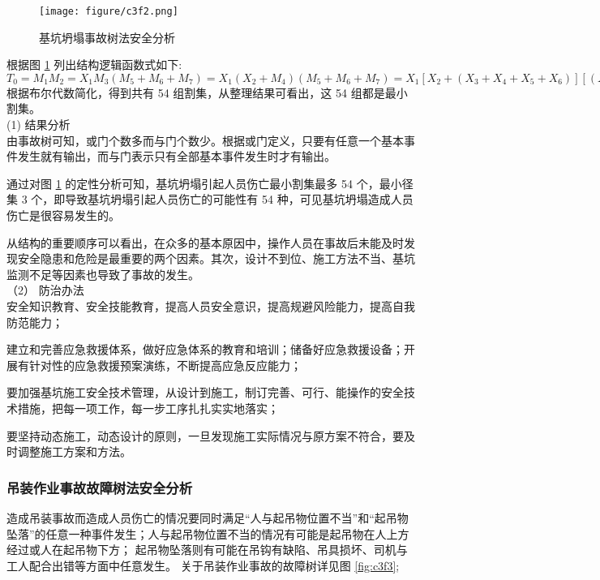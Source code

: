 \begin{figure}[thbp!]
    \centering
    \texttt{[image: figure/c3f2.png]}
    \caption{基坑坍塌事故树法安全分析}
    \label{fig:c3f1}
\end{figure}

根据图 \ref{fig:c3f1} 列出结构逻辑函数式如下:\\

$T_0=M_1M_2=X_1M_3(M_5+M_6+M_7)=X_1(X_2+M_4)(M_5+M_6+M_7)=X_1[X_2+(X_3+X_4+X_5+X_6)][(X_7+X_8+X_9)+(X_{10}+X_{11}+X_{12}+X_{13}+X_{14})+(X_{15}+X_{16}+X_{17})+X_{18}]$\\

根据布尔代数简化，得到共有 54 组割集，从整理结果可看出，这 54 组都是最小割集。\\

(1) 结果分析\\

 由事故树可知，或门个数多而与门个数少。根据或门定义，只要有任意一个基本事件发生就有输出，而与门表示只有全部基本事件发生时才有输出。

 通过对图 \ref{fig:c3f1} 的定性分析可知，基坑坍塌引起人员伤亡最小割集最多 54 个，最小径集 3 个，即导致基坑坍塌引起人员伤亡的可能性有 54 种，可见基坑坍塌造成人员伤亡是很容易发生的。

 从结构的重要顺序可以看出，在众多的基本原因中，操作人员在事故后未能及时发现安全隐患和危险是最重要的两个因素。其次，设计不到位、施工方法不当、基坑监测不足等因素也导致了事故的发生。\\

（2） 防治办法\\

 安全知识教育、安全技能教育，提高人员安全意识，提高规避风险能力，提高自我防范能力；

 建立和完善应急救援体系，做好应急体系的教育和培训；储备好应急救援设备；开展有针对性的应急救援预案演练，不断提高应急反应能力；

 要加强基坑施工安全技术管理，从设计到施工，制订完善、可行、能操作的安全技术措施，把每一项工作，每一步工序扎扎实实地落实；

 要坚持动态施工，动态设计的原则，一旦发现施工实际情况与原方案不符合，要及时调整施工方案和方法。


\subsubsection{吊装作业事故故障树法安全分析}

造成吊装事故而造成人员伤亡的情况要同时满足“人与起吊物位置不当”和“起吊物坠落”的任意一种事件发生；人与起吊物位置不当的情况有可能是起吊物在人上方经过或人在起吊物下方；
起吊物坠落则有可能在吊钩有缺陷、吊具损坏、司机与工人配合出错等方面中任意发生。
关于吊装作业事故的故障树详见图 \ref{fig:c3f3};

